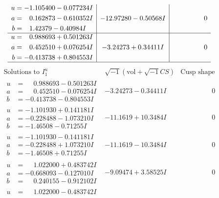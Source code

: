 \documentclass[1p]{elsarticle_modified}
\theoremstyle{definition}
\newcommand{\I}{\sqrt{-1}}
\begin{document}
$$\begin{array}{c|c|c}
\begin{aligned}
u &= -1.105400 - 0.077234 I \\
a &= \phantom{-}0.162873 - 0.610352 I \\
b &= \phantom{-}1.42379 - 0.40984 I\end{aligned}
 & -12.97280 - 0.50568 I & \phantom{-0.000000 } 0 \\ \hline\begin{aligned}
u &= \phantom{-}0.988693 + 0.501263 I \\
a &= \phantom{-}0.452510 + 0.076254 I \\
b &= -0.413738 + 0.804553 I\end{aligned}
 & -3.24273 + 0.34411 I & \phantom{-0.000000 } 0\\
 \hline 
 \end{array}$$\newpage$$\begin{array}{c|c|c}  
\text{Solutions to }I^u_{1}& \I (\text{vol} + \sqrt{-1}CS) & \text{Cusp shape}\\
 \hline 
\begin{aligned}
u &= \phantom{-}0.988693 - 0.501263 I \\
a &= \phantom{-}0.452510 - 0.076254 I \\
b &= -0.413738 - 0.804553 I\end{aligned}
 & -3.24273 - 0.34411 I & \phantom{-0.000000 } 0 \\ \hline\begin{aligned}
u &= -1.101930 + 0.141181 I \\
a &= -0.228488 - 1.073210 I \\
b &= -1.46508 - 0.71255 I\end{aligned}
 & -11.1619 + 10.3484 I & \phantom{-0.000000 } 0 \\ \hline\begin{aligned}
u &= -1.101930 - 0.141181 I \\
a &= -0.228488 + 1.073210 I \\
b &= -1.46508 + 0.71255 I\end{aligned}
 & -11.1619 - 10.3484 I & \phantom{-0.000000 } 0 \\ \hline\begin{aligned}
u &= \phantom{-}1.022000 + 0.483742 I \\
a &= -0.668093 - 0.127010 I \\
b &= \phantom{-}0.240155 - 0.912102 I\end{aligned}
 & -9.09474 + 3.58525 I & \phantom{-0.000000 } 0 \\ \hline\begin{aligned}
u &= \phantom{-}1.022000 - 0.483742 I \\

\end{aligned}
\end{array}$$
\end{document}
